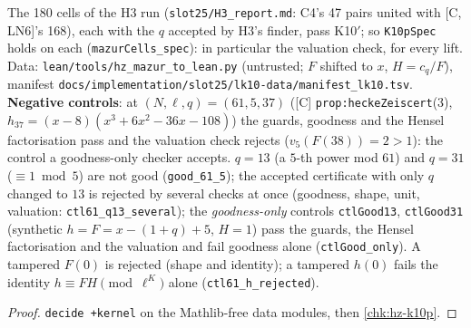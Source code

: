 \begin{theorem}\label{chk:hz-mazur-cells}
  \leanok
  The 180 cells of the H3 run (\texttt{slot25/H3\_report.md}: C4's 47 pairs united with [C, LN6]'s 168), each with the $q$ accepted by H3's
  finder, pass K10$'$; so \texttt{K10pSpec} holds on each (\texttt{mazurCells\_spec}): in particular the valuation check, for every lift. Data:
  \texttt{lean/tools/hz\_mazur\_to\_lean.py} (untrusted; $F$ shifted to $x$, $H=c_q/F$), manifest
  \texttt{docs/implementation/slot25/lk10-data/manifest\_lk10.tsv}. \textbf{Negative controls}: at $(N,\ell,q)=(61,5,37)$ ([C] \texttt{prop:heckeZeiscert}(3),
  $h_{37}=(x-8)(x^3+6x^2-36x-108)$) the guards, goodness and the Hensel factorisation pass and the valuation check rejects
  ($v_5(F(38))=2>1$): the control a goodness-only checker accepts. $q=13$ (a $5$-th power mod $61$) and $q=31$ ($\equiv1\bmod5$) are not good
  (\texttt{good\_61\_5}); the accepted certificate with only $q$ changed to $13$ is rejected by several checks at once (goodness, shape,
  unit, valuation: \texttt{ctl61\_q13\_several}); the \emph{goodness-only} controls \texttt{ctlGood13}, \texttt{ctlGood31} (synthetic
  $h=F=x-(1+q)+5$, $H=1$) pass the guards, the Hensel factorisation and the valuation and fail goodness alone (\texttt{ctlGood\_only}).
  A tampered $F(0)$ is rejected (shape and identity); a tampered $h(0)$ fails the identity $h\equiv FH\pmod{\ell^K}$ alone
  (\texttt{ctl61\_h\_rejected}).
\end{theorem}
\begin{proof}
  \leanok
  \texttt{decide +kernel} on the Mathlib-free data modules, then \ref{chk:hz-k10p}.
\end{proof}

